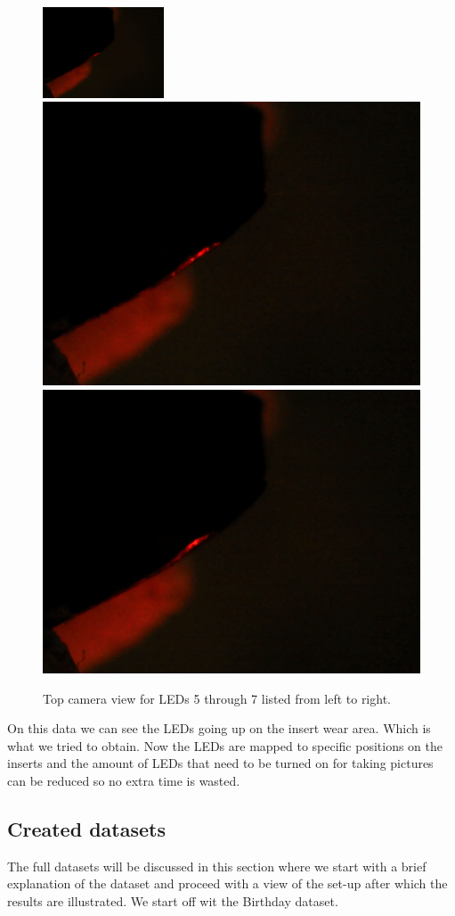 \begin{figure}
\includegraphics[width=0.32\textwidth, keepaspectratio=true]{./fig/Vision/Dataset/automated_datasets/1_check_camera_position/2_camera_position_top/p3_l5.png}\hfill
\includegraphics[width=.32\textwidth, keepaspectratio=true]{./fig/Vision/Dataset/automated_datasets/1_check_camera_position/2_camera_position_top/p3_l6.png}\hfill
\includegraphics[width=.32\textwidth, keepaspectratio=true]{./fig/Vision/Dataset/automated_datasets/1_check_camera_position/2_camera_position_top/p3_l7.png}
\caption{Top camera view for LEDs 5 through 7 listed from left to right.}
\label{fig:dataset:cameraposition:top:results}
\end{figure}

On this data we can see the LEDs going up on the insert wear area. Which is what we tried to obtain. Now the LEDs are mapped to specific positions on the inserts and the amount of LEDs that need to be turned on for taking pictures can be reduced so no extra time is wasted. 

		\subsection{Created datasets}

The full datasets will be discussed in this section where we start with a brief explanation of the dataset and proceed with a view of the set-up after which the results are illustrated. We start off wit the Birthday dataset.

